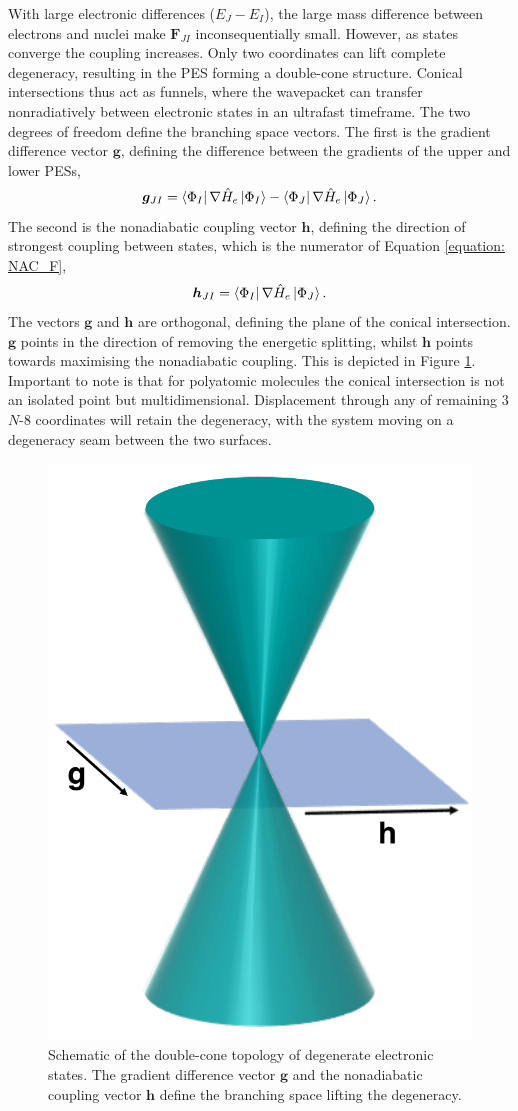 With large electronic differences ($E_{J}-E_{I}$), the large mass difference between electrons and nuclei make $\bm{F}_{JI}$ inconsequentially small. However, as states converge the coupling increases. Only two coordinates can lift complete degeneracy, resulting in the \ac{PES} forming a double-cone structure. Conical intersections thus act as funnels, where the wavepacket can transfer nonradiatively between electronic states in an ultrafast timeframe. The two degrees of freedom define the branching space vectors. The first is the gradient difference vector $\bm{g}$, defining the difference between the gradients of the upper and lower \acp{PES},
\begin{equation}
    \bm{g}_{JI}=\bra{\Phi_{I}}\nabla{}\hat{H}_{e}\ket{\Phi_{I}}-\bra{\Phi_{J}}\nabla{}\hat{H}_{e}\ket{\Phi_{J}}.
\end{equation}
The second is the nonadiabatic coupling vector $\bm{h}$, defining the direction of strongest coupling between states, which is the numerator of Equation \ref{equation: NAC_F},
\begin{equation}
    \bm{h}_{JI}=\bra{\Phi_{I}}\nabla{}\hat{H}_{e}\ket{\Phi_{J}}.
\end{equation}
The vectors $\bm{g}$ and $\bm{h}$ are orthogonal, defining the plane of the conical intersection. $\bm{g}$ points in the direction of removing the energetic splitting, whilst $\bm{h}$ points towards maximising the nonadiabatic coupling. This is depicted in Figure \ref{figure: Cone}. Important to note is that for polyatomic molecules the conical intersection is not an isolated point but multidimensional. Displacement through any of remaining 3$N$-8 coordinates will retain the degeneracy, with the system moving on a degeneracy seam between the two surfaces.
\begin{figure}[H]
\centering
  \includegraphics[width=0.4\linewidth]{2Theory/cone.pdf}
  \caption[Schematic of the double-cone topology of degenerate electronic states]{Schematic of the double-cone topology of degenerate electronic states. The gradient difference vector $\bm{g}$ and the nonadiabatic coupling vector $\bm{h}$ define the branching space lifting the degeneracy.}
  \label{figure: Cone}
\end{figure}
